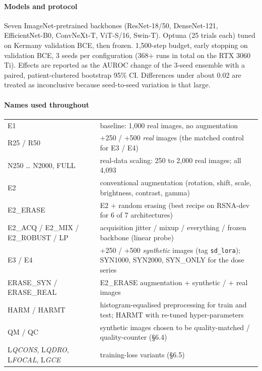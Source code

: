 \documentclass[10pt,a4paper]{article}
\begin{document}
\paragraph{Models and protocol} Seven ImageNet-pretrained backbones (ResNet-18/50, DenseNet-121, EfficientNet-B0, ConvNeXt-T,
ViT-S/16, Swin-T). Optuna (25 trials each) tuned on Kermany validation BCE, then frozen. 1,500-step budget, early stopping on
validation BCE, 3 seeds per configuration (368+ runs in total on the RTX 3060 Ti). Effects are reported as the AUROC change of
the 3-seed ensemble with a paired, patient-clustered bootstrap 95\% CI. Differences under about 0.02 are treated as inconclusive
because seed-to-seed variation is that large.

\paragraph{Names used throughout}
\begin{center}\small
\begin{tabularx}{\linewidth}{@{}l Y@{}}
\toprule
E1 & baseline: 1,000 real images, no augmentation \\
R25 / R50 & +250 / +500 \emph{real} images (the matched control for E3 / E4) \\
N250 … N2000, FULL & real-data scaling: 250 to 2,000 real images; all 4,093 \\
E2 & conventional augmentation (rotation, shift, scale, brightness, contrast, gamma) \\
E2_ERASE & E2 + random erasing (best recipe on RSNA-dev for 6 of 7 architectures) \\
E2_ACQ / E2_MIX / E2_ROBUST / LP & acquisition jitter / mixup / everything / frozen backbone (linear probe) \\
E3 / E4 & +250 / +500 \emph{synthetic} images (tag \texttt{sd_lora}); SYN1000, SYN2000, SYN_ONLY for the dose series \\
ERASE_SYN / ERASE_REAL & E2_ERASE augmentation + synthetic / + real images \\
HARM / HARMT & histogram-equalised preprocessing for train and test; HARMT with re-tuned hyper-parameters \\
QM / QC & synthetic images chosen to be quality-matched / quality-counter (§6.4) \\
L\emph{QCONS}, L\emph{QDRO}, L\emph{FOCAL}, L\emph{GCE} & training-loss variants (§6.5) \\
\bottomrule
\end{tabularx}
\end{center}
\end{document}
